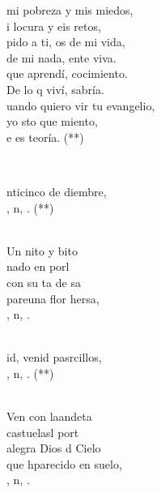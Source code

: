 \documentclass[12pt]{article}
\begin{document}
\begin{multicols*}{2}
\begin{cancion}
\begin{chorus}
	mi pobreza y  mis miedos, \\
	i locura y eis retos,\\
	pido a ti, os de mi vida, \\
	 de mi nada, ente viva.\\
	que aprendí, cocimiento. \\
	De lo q viví, sabría.\\
	uando quiero vir tu evangelio, \\
	yo sto que miento,\\
	e es teoría. (**)\\
	\end{chorus}%
	\jump\\
\end{cancion}%

\begin{cancion}%
	\begin{chorus}%
	nticinco de diembre,\\
	, n, . (**)\\
	\end{chorus}%
	\jump\\
	Un nito y bito \\
	 nado en  porl\\
	con su ta de sa\\
	pareuna flor hersa,\\
	, n, .\\\jump\\
	\begin{chorus}%
	id, venid pasrcillos,\\
	, n, . (**)\\
	\end{chorus}%
	\jump\\
	Ven con laandeta\\
	castuelasl port \\
	alegra Dios d Cielo\\
	que hparecido en  suelo,\\
	, n, .\\
\end{cancion}%


\end{multicols*}
\end{document}
